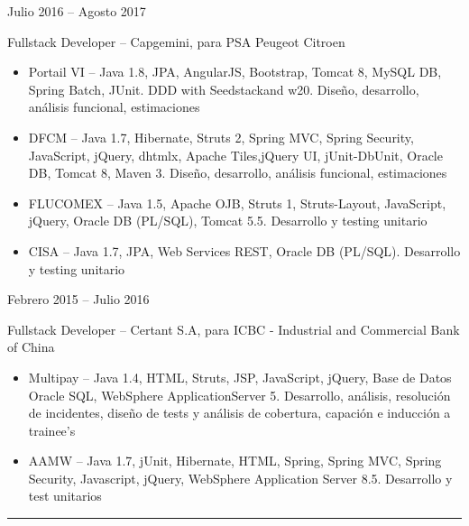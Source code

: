 \documentclass[a4paper,10pt]{article}
\newlength{\cvcolumngapwidth}
\newlength{\cvleftcolumnwidth}
\newlength{\cvrightcolumnwidth}
\newcommand{\cvsectionstyle}[1]{{\normalsize\cvsectionfont\textcolor{cvsectioncolor}{#1}}}
\newcommand{\cvtitlestyle}[1]{{\large\cvtitlefont\textcolor{cvtitlecolor}{#1}}}
\newcommand{\cvdurationstyle}[1]{{\small\cvdurationfont\textcolor{cvdurationcolor}{#1}}}
\newlength{\cvafteritemskipamount}
\newlength{\cvaftersectionskipamount}
\newlength{\cvaftertitleskipamount}
\newlength{\cvparskip}
\newcommand{\cvsection}[1]{
    \begin{minipage}[t]{\cvleftcolumnwidth}
        \raggedleft\cvsectionstyle{#1}
    \end{minipage}%
    \hspace{\cvcolumngapwidth}%
    \begin{minipage}[t]{\cvrightcolumnwidth}
        \textcolor{cvrulecolor}{\rule{\cvrightcolumnwidth}{0.6mm}}
    \end{minipage}

    \vspace{\cvaftersectionskipamount}
}
\newcommand{\cvitem}[2]{
    \begin{minipage}[t]{\cvleftcolumnwidth}
        \raggedleft #1
    \end{minipage}%
    \hspace{\cvcolumngapwidth}%
    \begin{minipage}[t]{\cvrightcolumnwidth}
        \setlength{\parskip}{\cvparskip} #2
    \end{minipage}

    \vspace{\cvafteritemskipamount}
}
\newcommand{\cvtitle}[1]{
    \cvtitlestyle{#1}

    \vspace{\cvaftertitleskipamount}
    \vspace{-\cvparskip}
}
\newcommand{\emptyline}{\vspace{1mm}}
\begin{document}
\cvitem{
    \cvdurationstyle{Julio 2016 -- Agosto 2017}
}{
    \cvtitle{Fullstack Developer -- \normalsize Capgemini, para PSA Peugeot Citroen \emptyline}

    \begin{itemize}[leftmargin=*]
    
        \item Portail VI -- Java 1.8, JPA, AngularJS, Bootstrap, Tomcat 8, MySQL DB, Spring Batch, JUnit. DDD with Seedstackand w20. Diseño, desarrollo, análisis funcional, estimaciones \emptyline
        
        \item DFCM -- Java 1.7, Hibernate, Struts 2, Spring MVC, Spring Security, JavaScript, jQuery, dhtmlx, Apache Tiles,jQuery UI, jUnit-DbUnit, Oracle DB, Tomcat 8, Maven 3. Diseño, desarrollo, análisis funcional, estimaciones \emptyline
        
        \item FLUCOMEX -- Java 1.5, Apache OJB, Struts 1, Struts-Layout, JavaScript, jQuery, Oracle DB (PL/SQL), Tomcat 5.5. Desarrollo y testing unitario\emptyline
        
        \item CISA -- Java 1.7, JPA, Web Services REST, Oracle DB (PL/SQL). Desarrollo y testing unitario
        
    \end{itemize}
}

\cvitem{
    \cvdurationstyle{Febrero 2015 -- Julio 2016}
}{
    \cvtitle{Fullstack Developer -- \normalsize Certant S.A, para ICBC - Industrial and Commercial Bank of China \emptyline}
    
    \begin{itemize}[leftmargin=*]
        \item Multipay -- Java 1.4, HTML, Struts, JSP, JavaScript, jQuery, Base de Datos Oracle SQL, WebSphere ApplicationServer 5. Desarrollo, análisis, resolución de incidentes, diseño de tests y análisis de cobertura, capación e inducción a trainee's \emptyline
        
        \item AAMW -- Java 1.7, jUnit, Hibernate, HTML, Spring, Spring MVC, Spring Security, Javascript, jQuery, WebSphere Application Server 8.5. Desarrollo y test unitarios
        
    \end{itemize}
}


\cvsection{EDUCACIÓN}
\end{document}
